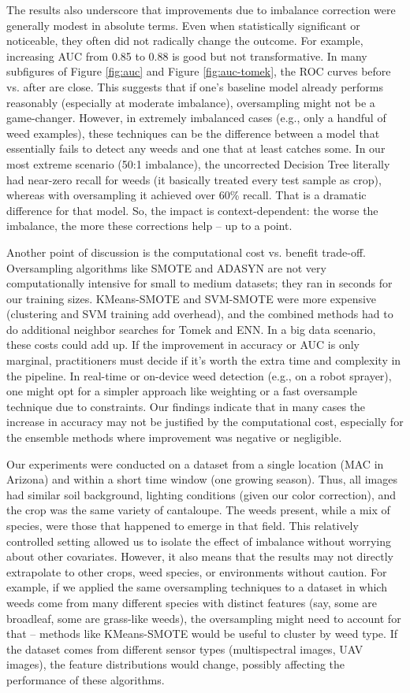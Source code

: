 \documentclass[agriengineering,article,submit,pdftex,moreauthors]{Definitions/mdpi}
\begin{document}
The results also underscore that improvements due to imbalance correction were generally modest in absolute terms. Even when statistically significant or noticeable, they often did not radically change the outcome. For example, increasing AUC from 0.85 to 0.88 is good but not transformative. In many subfigures of Figure \ref{fig:auc} and Figure \ref{fig:auc-tomek}, the ROC curves before vs. after are close. This suggests that if one’s baseline model already performs reasonably (especially at moderate imbalance), oversampling might not be a game-changer. However, in extremely imbalanced cases (e.g., only a handful of weed examples), these techniques can be the difference between a model that essentially fails to detect any weeds and one that at least catches some. In our most extreme scenario (50:1 imbalance), the uncorrected Decision Tree literally had near-zero recall for weeds (it basically treated every test sample as crop), whereas with oversampling it achieved over 60\% recall. That is a dramatic difference for that model. So, the impact is context-dependent: the worse the imbalance, the more these corrections help – up to a point.

Another point of discussion is the computational cost vs. benefit trade-off. Oversampling algorithms like SMOTE and ADASYN are not very computationally intensive for small to medium datasets; they ran in seconds for our training sizes. KMeans-SMOTE and SVM-SMOTE were more expensive (clustering and SVM training add overhead), and the combined methods had to do additional neighbor searches for Tomek and ENN. In a big data scenario, these costs could add up. If the improvement in accuracy or AUC is only marginal, practitioners must decide if it’s worth the extra time and complexity in the pipeline. In real-time or on-device weed detection (e.g., on a robot sprayer), one might opt for a simpler approach like weighting or a fast oversample technique due to constraints. Our findings indicate that in many cases the increase in accuracy may not be justified by the computational cost, especially for the ensemble methods where improvement was negative or negligible.

Our experiments were conducted on a dataset from a single location (MAC in Arizona) and within a short time window (one growing season). Thus, all images had similar soil background, lighting conditions (given our color correction), and the crop was the same variety of cantaloupe. The weeds present, while a mix of species, were those that happened to emerge in that field. This relatively controlled setting allowed us to isolate the effect of imbalance without worrying about other covariates. However, it also means that the results may not directly extrapolate to other crops, weed species, or environments without caution. For example, if we applied the same oversampling techniques to a dataset in which weeds come from many different species with distinct features (say, some are broadleaf, some are grass-like weeds), the oversampling might need to account for that – methods like KMeans-SMOTE would be useful to cluster by weed type. If the dataset comes from different sensor types (multispectral images, UAV images), the feature distributions would change, possibly affecting the performance of these algorithms.
\end{document}

